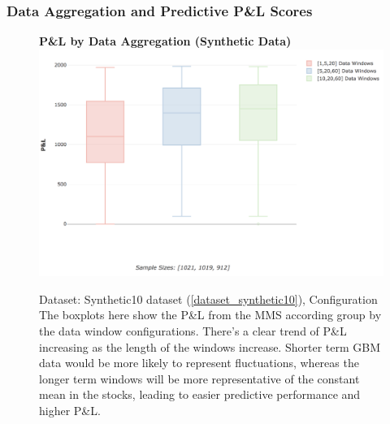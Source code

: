 \documentclass[a4paper,11pt,oneside]{article}
\theoremstyle{plain}
\theoremstyle{definition}
\begin{document}
\subsubsection{Data Aggregation and Predictive P\&L Scores}\label{results_data_pl}

\begin{figure}[H]
	\centering 
	\textbf{P\&L by Data Aggregation (Synthetic Data)}
	\includegraphics[scale=0.4]{images/results/data/test_aggregation_pl.png}
	\caption{
		Dataset: Synthetic10 dataset (\ref{dataset_synthetic10}), Configuration 
		\newline  The boxplots here show the P\&L from the MMS according group by the data window configurations. There's a clear trend of P\&L increasing as the length of the windows increase. Shorter term GBM data would be more likely to represent fluctuations, whereas the longer term windows will be more representative of the constant mean in the stocks, leading to easier predictive performance and higher P\&L.}
	\label{figure-test_aggregation_pl}
\end{figure}
\end{document}
